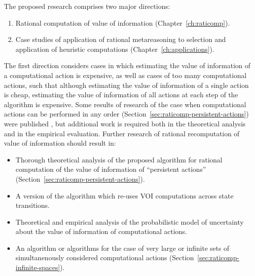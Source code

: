 The proposed research comprises two major directions:
\begin {enumerate}
\item Rational computation of value of information (Chapter~\ref{ch:raticomp}).
\item Case studies of application of rational metareasoning to
  selection and application of heuristic computations (Chapter~\ref{ch:applications}).
\end {enumerate}

The first direction considers cases in which estimating the value
of information of a computational action is expensive, as well as
cases of too many computational actions, such that although
estimating the value of information of a single action is cheap,
estimating the value of information of all actions at each step of the
algorithm is expensive. Some results of research of the case when
computational actions can be performed in any order
(Section~\ref{sec:raticomp-persistent-actions}) were published
\cite{Tolpin.raticomp}, but additional work is required both in
the theoretical analysis and in the empirical evaluation. Further
research of rational recomputation of value of information should
result in:
\begin{itemize}
\item Thorough theoretical analysis of the proposed algorithm for
rational computation of the value of information of ``persistent
actions'' (Section~\ref{sec:raticomp-persistent-actions}).
\item A version of the algorithm which re-uses VOI computations
across state transitions.
\item Theoretical and empirical analysis of the probabilistic model of
uncertainty about the value of information of computational actions.
\item An algorithm or algorithms for the case of very large or infinite
sets of simultanenously considered computational actions
(Section~\ref{sec:raticomp-infinite-spaces}).
\end{itemize}


